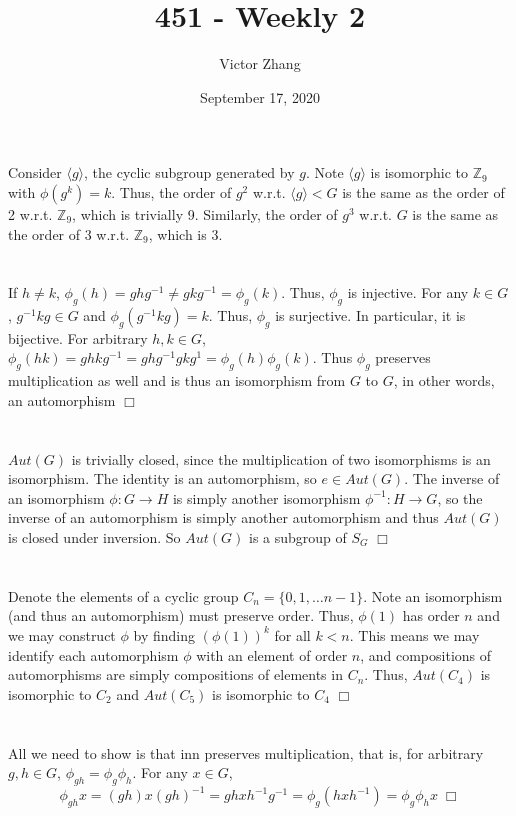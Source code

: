 \documentclass{article}
\title{451 - Weekly 2}
\author{Victor Zhang}
\date{September 17, 2020}
\newcommand{\cyclicsg}[1]{\langle {#1} \rangle}
\begin{document}
\maketitle

\section{}
Consider $\cyclicsg{g}$, the cyclic subgroup generated by $g$. Note $\cyclicsg{g}$ is isomorphic to $\mathbb{Z}_9$ with $\phi(g^k) = k$. Thus, the order of $g^2$ w.r.t. $\cyclicsg{g} < G$ is the same as the order of 2 w.r.t. $\mathbb{Z}_9$, which is trivially 9. Similarly, the order of $g^3$ w.r.t. $G$ is the same as the order of 3 w.r.t. $\mathbb{Z}_9$, which is 3.

\section{}
If $h \neq k$, $\phi_g(h) = ghg^{-1} \neq gkg^{-1} = \phi_g(k)$. Thus, $\phi_g$ is injective. For any $k \in G$, $g^{-1}kg \in G$ and $\phi_g(g^{-1}kg) = k$. Thus, $\phi_g$ is surjective. In particular, it is bijective. For arbitrary $h,k \in G$, $\phi_g(hk) = ghkg^{-1} = ghg^{-1}gkg^1 = \phi_g(h)\phi_g(k)$. Thus $\phi_g$ preserves multiplication as well and is thus an isomorphism from $G$ to $G$, in other words, an automorphism $\Box$

\section{}
$Aut(G)$ is trivially closed, since the multiplication of two isomorphisms is an isomorphism. The identity is an automorphism, so $e \in Aut(G)$. The inverse of an isomorphism $\phi: G \rightarrow H$ is simply another isomorphism $\phi^{-1}: H \rightarrow G$, so the inverse of an automorphism is simply another automorphism and thus $Aut(G)$ is closed under inversion. So $Aut(G)$ is a subgroup of $S_G$ $\Box$

\section{}
Denote the elements of a cyclic group $C_n = \{0,1,\dots n-1\}$. Note an isomorphism (and thus an automorphism) must preserve order. Thus, $\phi(1)$ has order $n$ and we may construct $\phi$ by finding $\left(\phi(1)\right)^k$ for all $k < n$. This means we may identify each automorphism $\phi$ with an element of order $n$, and compositions of automorphisms are simply compositions of elements in $C_n$. Thus, $Aut(C_4)$ is isomorphic to $C_2$ and $Aut(C_5)$ is isomorphic to $C_4$ $\Box$

\section{}
All we need to show is that $\textrm{inn}$ preserves multiplication, that is, for arbitrary $g,h \in G$, $\phi_{gh} = \phi_g \phi_h$. For any $x \in G$,
$$\phi_{gh} x = (gh)x(gh)^{-1} = ghxh^{-1}g^{-1} = \phi_g (hxh^{-1}) = \phi_g \phi_h x \; \Box$$
\end{document}
